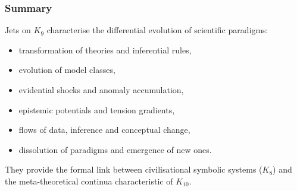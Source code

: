 \subsubsection{Summary}

Jets on $K_9$ characterise the differential evolution of scientific
paradigms:
\begin{itemize}
    \item transformation of theories and inferential rules,
    \item evolution of model classes,
    \item evidential shocks and anomaly accumulation,
    \item epistemic potentials and tension gradients,
    \item flows of data, inference and conceptual change,
    \item dissolution of paradigms and emergence of new ones.
\end{itemize}

They provide the formal link between civilisational symbolic systems
($K_8$) and the meta-theoretical continua characteristic of $K_{10}$.

